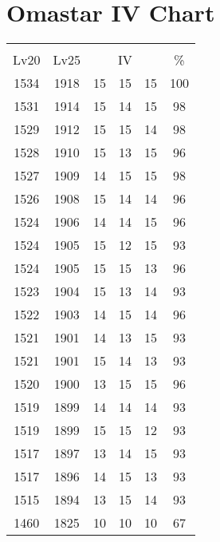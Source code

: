 \documentclass{article}%
\begin{document}
%
\normalsize%
\section{Omastar IV Chart}%
\label{sec:Omastar IV Chart}%
\renewcommand{\arraystretch}{1.5}%
\begin{tabular}{|c|c|c|c|c|c|}%
\hline%
\multicolumn{6}{|c|}{\textcolor{white}{ 
\linebreak{Omastar}
}%
\cellcolor{black}}\\%
\multicolumn{1}{|c}{Lv20}&\multicolumn{1}{c|}{Lv25}&\multicolumn{3}{c|}{IV}&\multicolumn{1}{|c|}{\%}\\%
\hline%
\rowcolor{color100}%
1534&1918&15&15&15&100\\%
\hline%
\rowcolor{color98}%
1531&1914&15&14&15&98\\%
\hline%
\rowcolor{color98}%
1529&1912&15&15&14&98\\%
\hline%
\rowcolor{color96}%
1528&1910&15&13&15&96\\%
\hline%
\rowcolor{color98}%
1527&1909&14&15&15&98\\%
\hline%
\rowcolor{color96}%
1526&1908&15&14&14&96\\%
\hline%
\rowcolor{color96}%
1524&1906&14&14&15&96\\%
\hline%
\rowcolor{color93}%
1524&1905&15&12&15&93\\%
\hline%
\rowcolor{color96}%
1524&1905&15&15&13&96\\%
\hline%
\rowcolor{color93}%
1523&1904&15&13&14&93\\%
\hline%
\rowcolor{color96}%
1522&1903&14&15&14&96\\%
\hline%
\rowcolor{color93}%
1521&1901&14&13&15&93\\%
\hline%
\rowcolor{color93}%
1521&1901&15&14&13&93\\%
\hline%
\rowcolor{color96}%
1520&1900&13&15&15&96\\%
\hline%
\rowcolor{color93}%
1519&1899&14&14&14&93\\%
\hline%
\rowcolor{color93}%
1519&1899&15&15&12&93\\%
\hline%
\rowcolor{color93}%
1517&1897&13&14&15&93\\%
\hline%
\rowcolor{color93}%
1517&1896&14&15&13&93\\%
\hline%
\rowcolor{color93}%
1515&1894&13&15&14&93\\%
\hline%
\rowcolor{color91}%
1460&1825&10&10&10&67\\%
\end{tabular}

%
\end{document}
